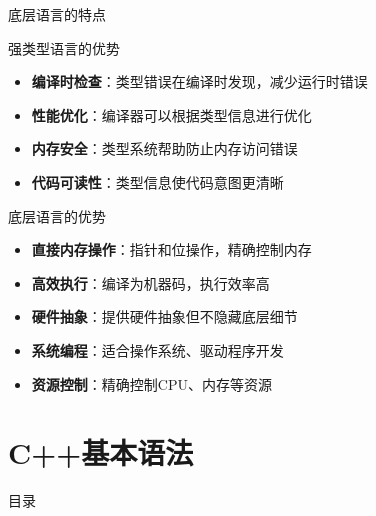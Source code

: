 \documentclass[UTF8,aspectratio=169]{beamer}
\begin{document}
\begin{frame}{底层语言的特点}
    \begin{ytublock}{强类型语言的优势}
        \begin{itemize}
            \item \textbf{编译时检查}：类型错误在编译时发现，减少运行时错误
            \item \textbf{性能优化}：编译器可以根据类型信息进行优化
            \item \textbf{内存安全}：类型系统帮助防止内存访问错误
            \item \textbf{代码可读性}：类型信息使代码意图更清晰
        \end{itemize}
    \end{ytublock}

    \begin{ytublock}{底层语言的优势}
        \begin{itemize}
            \item \textbf{直接内存操作}：指针和位操作，精确控制内存
            \item \textbf{高效执行}：编译为机器码，执行效率高
            \item \textbf{硬件抽象}：提供硬件抽象但不隐藏底层细节
            \item \textbf{系统编程}：适合操作系统、驱动程序开发
            \item \textbf{资源控制}：精确控制CPU、内存等资源
        \end{itemize}
    \end{ytublock}
\end{frame}

\section{C++基本语法}
\begin{frame}{目录}
    \begin{multicols}{2}
        \tableofcontents[currentsection]
    \end{multicols}
\end{frame}
\end{document}

